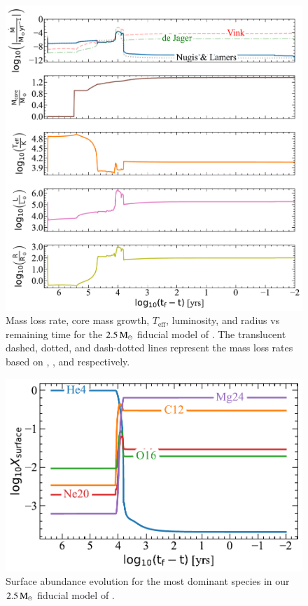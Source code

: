 \documentclass[main.tex]{subfiles}
\begin{document}
\begin{figure}[h!]
    \centering
    \includegraphics[width=0.65\columnwidth]{figures/chapter2/envelope_grid/envelope_evolution_grid.pdf}
    \caption{Mass loss rate, core mass growth, $T_{\text{eff}}$, luminosity, and radius vs remaining time for the $2.5\mathrm{\,M_\odot}$ fiducial model of \seriesone. The translucent dashed, dotted, and dash-dotted lines represent the mass loss rates based on \cite{Vink:2017ujd}, \cite{Nugis2000}, and \cite{deJager1988} respectively.}
    \label{fig:lum_teff_mdot_rad}
\end{figure}

\begin{figure}[h!]
    \centering
    \includegraphics[width=0.5\columnwidth]{figures/chapter2/abundances/log_surface_abundance_evolution_2p5.pdf}
    \caption{Surface abundance evolution for the most dominant species in our $2.5\mathrm{\,M_\odot}$ fiducial model of \seriesone.}
    \label{fig:surface_abun_evol}
\end{figure}
\end{document}
